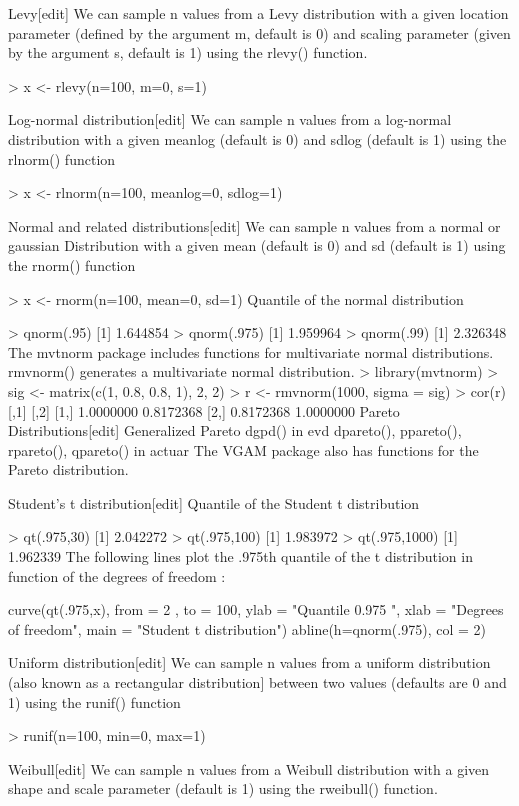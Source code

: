 \documentclass[12pt, a4paper]{article}
\theoremstyle{plain}
\theoremstyle{definition}
\theoremstyle{remark}
\begin{document}
Levy[edit]
We can sample n values from a Levy distribution with a given location parameter \mu (defined by the argument m, default is 0) and scaling parameter (given by the argument s, default is 1) using the rlevy() function.

> x <- rlevy(n=100, m=0, s=1)


Log-normal distribution[edit]
We can sample n values from a log-normal distribution with a given meanlog (default is 0) and sdlog (default is 1) using the rlnorm() function

> x <- rlnorm(n=100, meanlog=0, sdlog=1)


Normal and related distributions[edit]
We can sample n values from a normal or gaussian Distribution with a given mean (default is 0) and sd (default is 1) using the rnorm() function

> x <- rnorm(n=100, mean=0, sd=1)
Quantile of the normal distribution

> qnorm(.95)
[1] 1.644854
> qnorm(.975)
[1] 1.959964
> qnorm(.99)
[1] 2.326348
The mvtnorm package includes functions for multivariate normal distributions.
rmvnorm() generates a multivariate normal distribution.
> library(mvtnorm)
> sig <- matrix(c(1, 0.8, 0.8, 1), 2, 2)
> r <- rmvnorm(1000, sigma = sig)
> cor(r) 
          [,1]      [,2]
[1,] 1.0000000 0.8172368
[2,] 0.8172368 1.0000000
Pareto Distributions[edit]
Generalized Pareto dgpd() in evd
dpareto(), ppareto(), rpareto(), qpareto() in actuar
The VGAM package also has functions for the Pareto distribution.


Student's t distribution[edit]
Quantile of the Student t distribution

> qt(.975,30)
[1] 2.042272
> qt(.975,100)
[1] 1.983972
> qt(.975,1000)
[1] 1.962339
The following lines plot the .975th quantile of the t distribution in function of the degrees of freedom :

curve(qt(.975,x), from = 2 , to = 100, ylab = "Quantile 0.975 ", xlab = "Degrees of freedom", main = "Student t distribution")
abline(h=qnorm(.975), col = 2)


Uniform distribution[edit]
We can sample n values from a uniform distribution (also known as a rectangular distribution] between two values (defaults are 0 and 1) using the runif() function

> runif(n=100, min=0, max=1)


Weibull[edit]
We can sample n values from a Weibull distribution with a given shape and scale parameter \mu (default is 1) using the rweibull() function.
\end{document}

